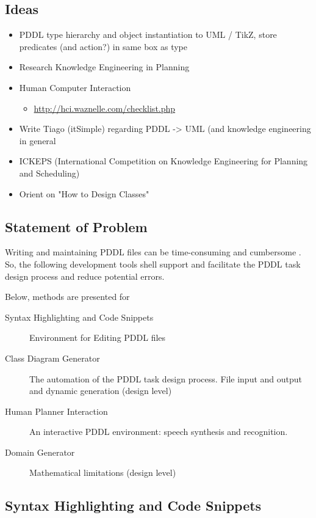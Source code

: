 \documentclass[11pt]{article}
\begin{document}
\subsection{Ideas}
\label{sec-4-1}
\begin{itemize}
\item PDDL type hierarchy and object instantiation to UML / TikZ, store
predicates (and action?) in same box as type
\item Research Knowledge Engineering in Planning
\item Human Computer Interaction
\begin{itemize}
\item \url{http://hci.waznelle.com/checklist.php}
\end{itemize}
\item Write Tiago (itSimple) regarding PDDL -> UML (and knowledge
engineering in general
\item ICKEPS (International Competition on Knowledge Engineering for
Planning and Scheduling)
\item Orient on "How to Design Classes"
\end{itemize}
\subsection{Statement of Problem}
\label{sec-4-2}
Writing and maintaining PDDL files can be time-consuming and
cumbersome \textcite{li2012translating}. So, the following development
tools shell support and facilitate the PDDL task design process and
reduce potential errors.

Below, methods are presented for

\begin{description}
\item[{Syntax Highlighting and Code Snippets}] Environment for Editing
PDDL files
\item[{Class Diagram Generator}] The automation of the PDDL task design process. File
input and output and dynamic generation (design level)
\item[{Human Planner Interaction}] An interactive PDDL environment: speech synthesis and
recognition.
\item[{Domain Generator}] Mathematical limitations (design level)
\end{description}
\subsection{Syntax Highlighting and Code Snippets}
\label{sec-4-3}
\end{document}
